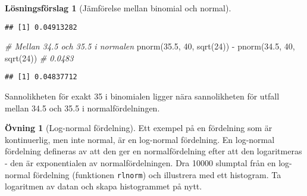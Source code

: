 \documentclass[
]{book}
\newenvironment{Shaded}{\begin{snugshade}}{\end{snugshade}}
\newcommand{\CommentTok}[1]{\textcolor[rgb]{0.56,0.35,0.01}{\textit{#1}}}
\newcommand{\DecValTok}[1]{\textcolor[rgb]{0.00,0.00,0.81}{#1}}
\newcommand{\FloatTok}[1]{\textcolor[rgb]{0.00,0.00,0.81}{#1}}
\newcommand{\FunctionTok}[1]{\textcolor[rgb]{0.00,0.00,0.00}{#1}}
\newcommand{\NormalTok}[1]{#1}
\newcommand{\SpecialCharTok}[1]{\textcolor[rgb]{0.00,0.00,0.00}{#1}}
\theoremstyle{definition}
\theoremstyle{definition}
\theoremstyle{definition}
\newtheorem{exercise}{Övning}[chapter]
\theoremstyle{definition}
\newtheorem{hypothesis}{Lösningsförslag}[chapter]
\theoremstyle{remark}
\begin{document}
\begin{hypothesis}[Jämförelse mellan binomial och normal]
\begin{verbatim}
## [1] 0.04913282
\end{verbatim}

\begin{Shaded}
\begin{Highlighting}[]
\CommentTok{\# Mellan 34.5 och 35.5 i normalen}
\FunctionTok{pnorm}\NormalTok{(}\FloatTok{35.5}\NormalTok{, }\DecValTok{40}\NormalTok{, }\FunctionTok{sqrt}\NormalTok{(}\DecValTok{24}\NormalTok{)) }\SpecialCharTok{{-}} \FunctionTok{pnorm}\NormalTok{(}\FloatTok{34.5}\NormalTok{, }\DecValTok{40}\NormalTok{, }\FunctionTok{sqrt}\NormalTok{(}\DecValTok{24}\NormalTok{)) }\CommentTok{\# 0.0483}
\end{Highlighting}
\end{Shaded}

\begin{verbatim}
## [1] 0.04837712
\end{verbatim}

Sannolikheten för exakt 35 i binomialen ligger nära sannolikheten för utfall mellan 34.5 och 35.5 i normalfördelningen.
\end{hypothesis}

\begin{exercise}[Log-normal fördelning]
Ett exempel på en fördelning som är kontinuerlig, men inte normal, är en log-normal fördelning. En log-normal fördelning defineras av att den ger en normalfördelning efter att den logaritmeras - den är exponentialen av normalfördelningen. Dra 10000 slumptal från en log-normal fördelning (funktionen \texttt{rlnorm}) och illustrera med ett histogram. Ta logaritmen av datan och skapa histogrammet på nytt.
\end{exercise}
\end{document}
